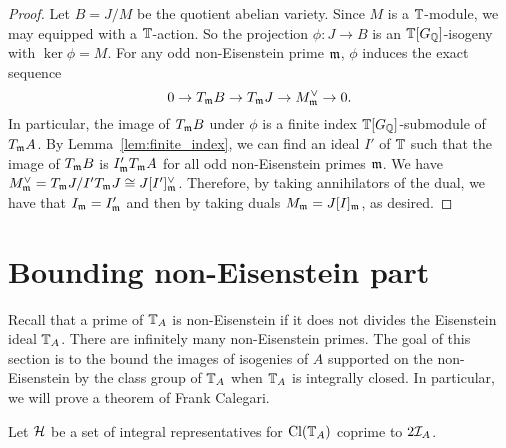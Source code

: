 \documentclass[thesis.tex]{subfiles}
\begin{document}
\begin{proof}
Let $B=J/M$ be the quotient abelian variety. Since $M$ is a $\mathbb{T}$-module,
we may equipped with a $\mathbb{T}$-action. So the projection $\phi:J \to B$ is an
$\mathbb{T}[G_{\mathbb{Q}}]$-isogeny with $\ker\phi = M$. For any odd non-Eisenstein prime
$\mathfrak{m}$, $\phi$ induces the exact sequence
\[
    0 \to T_{\mathfrak{m}} B \to T_{\mathfrak{m}} J \to M^\vee _{\mathfrak{m}} \to 0.
\]
In particular, the image of $T_{\mathfrak{m}} B$ under $\phi$ is a finite index
$\mathbb{T}[G_{\mathbb{Q}}]$-submodule of $T_{\mathfrak{m}} A$. By Lemma~\ref{lem:finite_index}, we can find
an ideal $I'$ of $\mathbb{T}$ such that the image of $T_{\mathfrak{m}} B$ is $I' _{\mathfrak{m}} T_{\mathfrak{m}} A$
for all odd non-Eisenstein primes $\mathfrak{m}$. We have $M^\vee _{\mathfrak{m}} = T_{\mathfrak{m}} J / I'
T_{\mathfrak{m}} J\cong J[I']_{\mathfrak{m}} ^\vee$. Therefore, by taking annihilators of the dual,
we have that $I_{\mathfrak{m}} = I'_{\mathfrak{m}}$ and then by taking duals $M_{\mathfrak{m}} = J[I]_{\mathfrak{m}}$, as
desired.
\end{proof}

\section{Bounding non-Eisenstein part}%
\label{sec:bounding_non_eisenstein_part}

Recall that a prime of $\mathbb{T}_A$ is non-Eisenstein if it does not divides the
Eisenstein ideal $\mathbb{T}_A$. There are infinitely many non-Eisenstein primes. The
goal of this section is to the bound the images of isogenies of $A$ supported
on the non-Eisenstein by the class group of $\mathbb{T}_A$ when $\mathbb{T}_A$ is integrally
closed. In particular, we will prove a theorem of Frank Calegari.

Let $\mathcal{H}$ be a set of integral representatives for $\operatorname{Cl}(\mathbb{T}_A)$ coprime to
$2\mathcal{I}_A$.
\end{document}
